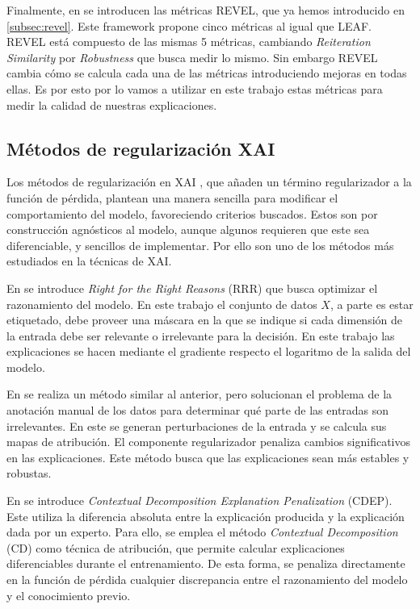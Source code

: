 Finalmente, en \cite{REVEL} se introducen las métricas REVEL, que ya hemos introducido en \ref{subsec:revel}. Este framework propone cinco métricas al igual que LEAF. REVEL está compuesto de las mismas 5 métricas, cambiando \textit{Reiteration Similarity} por \textit{Robustness} que busca medir lo mismo. Sin embargo REVEL cambia cómo se calcula cada una de las métricas introduciendo mejoras en todas ellas. Es por esto por lo vamos a utilizar en este trabajo estas métricas para medir la calidad de nuestras explicaciones.




\subsection*{Métodos de regularización XAI}

Los métodos de regularización en XAI \cite{XSHIELD, EstadoArteMetodos}, que añaden un término regularizador a la función de pérdida, plantean una manera sencilla para modificar el comportamiento del modelo, favoreciendo criterios buscados. Estos son por construcción agnósticos al modelo, aunque algunos requieren que  este sea diferenciable, y sencillos de implementar. Por ello son uno de los métodos más estudiados en la técnicas de XAI.

En \cite{RRR} se introduce \textit{Right for the Right Reasons} (RRR) que busca optimizar el razonamiento del modelo. En este trabajo el conjunto de datos $X$, a parte es estar etiquetado, debe proveer una máscara en la que se indique si cada dimensión de la entrada debe ser relevante o irrelevante para la decisión. En este trabajo las explicaciones se hacen mediante el gradiente respecto el logaritmo de la salida del modelo. 

En \cite{REGINPUTGRAD} se realiza un método similar al anterior, pero solucionan el problema de la anotación manual de los datos para determinar qué parte de las entradas son irrelevantes. En este se generan perturbaciones de la entrada y se calcula sus mapas de atribución. El componente regularizador penaliza cambios significativos en las explicaciones. Este método busca que las explicaciones sean más estables y robustas. 

En \cite{simpleregularizacion} se introduce \textit{Contextual Decomposition Explanation Penalization} (CDEP). Este utiliza la diferencia absoluta entre la explicación producida y la explicación dada por un experto. Para ello, se emplea el método \textit{Contextual Decomposition} (CD) como técnica de atribución, que permite calcular explicaciones diferenciables durante el entrenamiento. De esta forma, se penaliza directamente en la función de pérdida cualquier discrepancia entre el razonamiento del modelo y el conocimiento previo.

